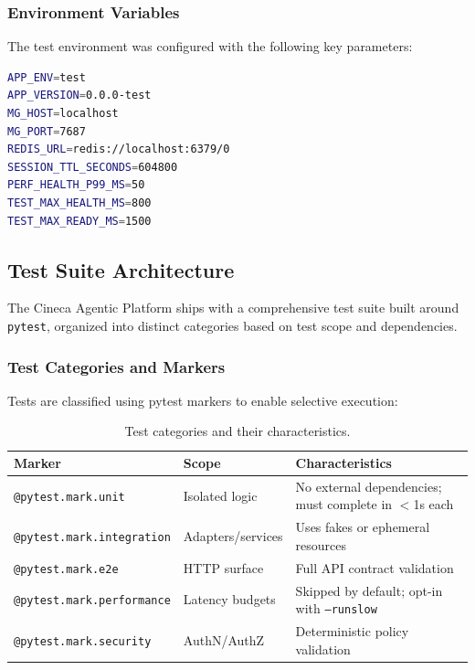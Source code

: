 \subsubsection{Environment Variables}

The test environment was configured with the following key parameters:

\begin{lstlisting}[language=bash,caption={Test environment configuration.}]
APP_ENV=test
APP_VERSION=0.0.0-test
MG_HOST=localhost
MG_PORT=7687
REDIS_URL=redis://localhost:6379/0
SESSION_TTL_SECONDS=604800
PERF_HEALTH_P99_MS=50
TEST_MAX_HEALTH_MS=800
TEST_MAX_READY_MS=1500
\end{lstlisting}

\subsection{Test Suite Architecture}

The Cineca Agentic Platform ships with a comprehensive test suite built around \texttt{pytest}, organized into distinct categories based on test scope and dependencies.

\subsubsection{Test Categories and Markers}

Tests are classified using pytest markers to enable selective execution:

\begin{table}[ht]
\centering
\caption{Test categories and their characteristics.}
\label{tab:test-categories}
\small
\begin{tabular}{llp{5.5cm}}
\hline
\textbf{Marker} & \textbf{Scope} & \textbf{Characteristics} \\
\hline
\texttt{@pytest.mark.unit} & Isolated logic & No external dependencies; must complete in $<$1s each \\
\texttt{@pytest.mark.integration} & Adapters/services & Uses fakes or ephemeral resources \\
\texttt{@pytest.mark.e2e} & HTTP surface & Full API contract validation \\
\texttt{@pytest.mark.performance} & Latency budgets & Skipped by default; opt-in with \texttt{--runslow} \\
\texttt{@pytest.mark.security} & AuthN/AuthZ & Deterministic policy validation \\
\hline
\end{tabular}
\end{table}

